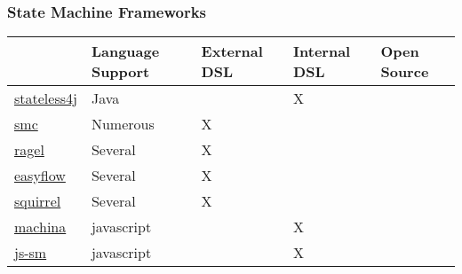 \documentclass{beamer}
\begin{document}
%
%



\begin{frame}
  \frametitle{State Machine Frameworks}
  \begin{tabularx}{\textwidth}{ |X|X|X|X|X| }
    \hline
    & Language Support & External DSL & Internal DSL & Open Source \\
    \hline
    \href{https://code.google.com/p/stateless4j/}{stateless4j} & Java & & X & \\ 
    \hline
     \href{http://smc.sourceforge.net/}{smc} &Numerous & X & & \\ 
    \hline
     \href{http://www.complang.org/ragel/}{ragel} & Several & X & & \\ 
    \hline
     \href{https://github.com/Beh01der/EasyFlow/}{easyflow} & Several &
    X & & \\ 
    \hline
     \href{https://github.com/hekailiang/squirrel}{squirrel} & Several & X & & \\ 
    \hline
    \href{https://github.com/ifandelse/machina.js}{machina} &
    javascript & & X & \\
    \hline
    \href{https://github.com/jakesgordon/javascript-state-machine}{js-sm} &
    javascript & & X & \\
    \hline
    \end{tabularx}
\end{frame}
\end{document}
